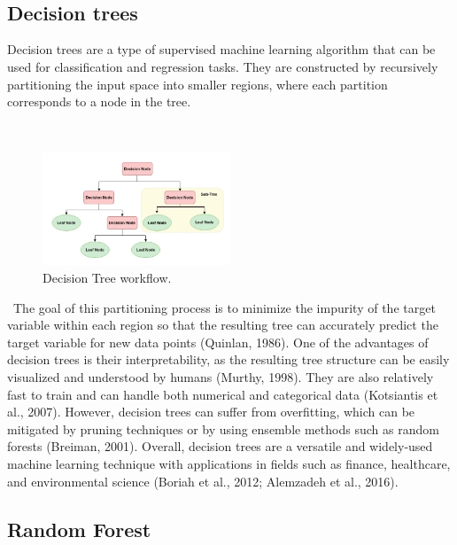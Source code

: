 \documentclass{IEEEtran}
\begin{document}
\\
\
\subsection{Decision trees}

Decision trees are a type of supervised machine learning algorithm that can be used for classification and regression tasks. They are constructed by recursively partitioning the input space into smaller regions, where each partition corresponds to a node in the tree. 

\

\begin{figure}[h]
\centering
\includegraphics[width=0.5\textwidth]{df.png}
\caption{\label{fig:dt}Decision Tree workflow.}
\end{figure}

\
The goal of this partitioning process is to minimize the impurity of the target variable within each region so that the resulting tree can accurately predict the target variable for new data points (Quinlan, 1986). One of the advantages of decision trees is their interpretability, as the resulting tree structure can be easily visualized and understood by humans (Murthy, 1998). They are also relatively fast to train and can handle both numerical and categorical data (Kotsiantis et al., 2007). However, decision trees can suffer from overfitting, which can be mitigated by pruning techniques or by using ensemble methods such as random forests (Breiman, 2001). Overall, decision trees are a versatile and widely-used machine learning technique with applications in fields such as finance, healthcare, and environmental science (Boriah et al., 2012; Alemzadeh et al., 2016).

\subsection{Random Forest}
\end{document}

